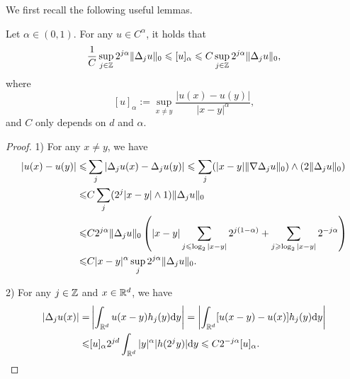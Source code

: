 We first recall the following useful lemmas. 
\begin{lemma}\label{lem:Besov-Holder}
    Let $\alpha\in (0,1)$. For any $u\in C^\alpha$, it holds that 
    \begin{align}\label{Ch}
	\frac{1}{C}\sup_{j\in {\mathbb Z}} 2^{j\alpha} \|\Delta_j u\|_0\leqslant [u]_{\alpha} \leqslant C \sup_{j\in {\mathbb Z}} 2^{j\alpha} \|\Delta_j u\|_0, 
    \end{align}
    where 
    \[
	[u]_\alpha:= \sup_{x\neq y} \frac{|u(x)-u(y)|}{|x-y|^\alpha}, 
    \]
    and $C$ only depends on $d$ and $\alpha$. 
\end{lemma}
\begin{proof}
    1) For any \(x\neq y\), we have 
    \begin{align*}
        |u(x)-u(y)| \leqslant& \sum_{j} |\Delta_j u(x)-\Delta_j u(y)| \leqslant \sum_j (|x-y|\|\nabla \Delta_j u\|_{0}) \wedge (2 \|\Delta_j u\|_0)\\
        \leqslant& C\sum_{j} (2^j|x-y|\wedge 1) \|\Delta_j u\|_0 \\
        \leqslant & C 2^{j\alpha}\|\Delta_j u\|_0  \left( |x-y| \sum_{j\leqslant \log_2 |x-y|} 2^{j(1-\alpha)}+ \sum_{j\geqslant \log_2 |x-y|} 2^{-j\alpha} \right) \\
        \leqslant & C |x-y|^\alpha \sup_{j} 2^{j\alpha} \|\Delta_j u\|_0. 
    \end{align*}
    
    2) For any \(j\in {\mathbb Z}\) and \(x\in {\mathbb R}^d\), we have 
    \begin{align*}
        |\Delta_j u(x)|=& \left| \int_{{\mathbb R}^d}  u(x-y) h_j(y) \text{\rm{d}} y \right|= \left| \int_{{\mathbb R}^d} [u(x-y)-u(x)] h_j(y) \text{\rm{d}} y \right| \\
        \leqslant & [u]_\alpha 2^{jd} \int_{{\mathbb R}^d} |y|^{\alpha} |h(2^{j}y)| \text{\rm{d}} y \leqslant C 2^{-j\alpha} [u]_\alpha. 
    \end{align*}
\end{proof}
	
